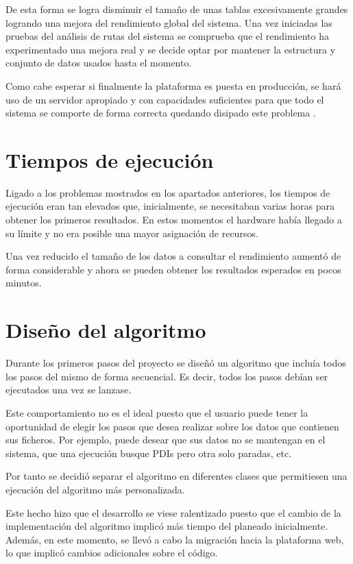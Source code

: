 De esta forma se logra disminuir el tamaño de unas tablas excesivamente grandes logrando una mejora del rendimiento global del sistema. Una vez iniciadas las pruebas del análisis de rutas del sistema se comprueba que el rendimiento ha experimentado una mejora real y se decide optar por mantener la estructura y conjunto de datos usados hasta el momento.


Como cabe esperar si finalmente la plataforma es puesta en producción, se hará uso de un servidor apropiado y con capacidades suficientes para que todo el sistema se comporte de forma correcta quedando disipado este problema .


\section{Tiempos de ejecución}
Ligado a los problemas mostrados en los apartados anteriores, los tiempos de ejecución eran tan elevados que, inicialmente, se necesitaban varias horas para obtener los primeros resultados. En estos momentos el hardware había llegado a su límite y no era posible una mayor asignación de recursos.

Una vez reducido el tamaño de los datos a consultar el rendimiento aumentó de forma considerable y ahora se pueden obtener los resultados esperados en pocos minutos.


\section{Diseño del algoritmo}
Durante los primeros pasos del proyecto se diseñó un algoritmo que incluía todos los pasos del mismo de forma secuencial. Es decir, todos los pasos debían ser ejecutados una vez se lanzase.

Este comportamiento no es el ideal puesto que el usuario puede tener la oportunidad de elegir los pasos que desea realizar sobre los datos que contienen sus ficheros. Por ejemplo, puede desear que sus datos no se mantengan en el sistema, que una ejecución busque PDIs pero otra solo paradas, etc.

Por tanto se decidió separar el algoritmo en diferentes clases que permitiesen una ejecución del algoritmo más personalizada.

Este hecho hizo que el desarrollo se viese ralentizado puesto que el cambio de la implementación del algoritmo implicó más tiempo del planeado inicialmente. Además, en este momento, se llevó a cabo la migración hacia la plataforma web, lo que implicó cambios adicionales sobre el código.

